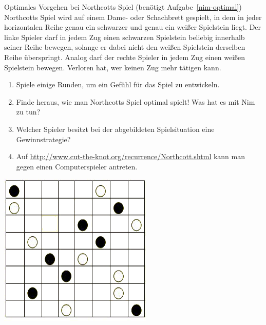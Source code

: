 \documentclass{zirkelblatt}
\begin{document}
\begin{aufgabe}{Optimales Vorgehen bei Northcotts Spiel
(benötigt Aufgabe~\ref{nim-optimal})}
Northcotts Spiel wird auf einem Dame- oder Schachbrett gespielt, in dem in
jeder horizontalen Reihe genau ein schwarzer und genau ein weißer Spielstein liegt.
Der linke Spieler darf in jedem Zug einen schwarzen Spielstein beliebig
innerhalb seiner Reihe bewegen, solange er dabei nicht den weißen Spielstein
derselben Reihe überspringt. Analog darf der rechte Spieler in jedem Zug einen
weißen Spielstein bewegen. Verloren hat, wer keinen Zug mehr tätigen kann.

\begin{enumerate}
\item Spiele einige Runden, um ein Gefühl für das Spiel zu entwickeln.
\item Finde heraus, wie man Northcotts Spiel optimal spielt! Was hat es mit Nim zu tun?
\item Welcher Spieler besitzt bei der abgebildeten Spielsituation eine
Gewinnstrategie?
\item Auf \url{http://www.cut-the-knot.org/recurrence/Northcott.shtml} kann man
gegen einen Computerspieler antreten.
\end{enumerate}

\begin{center}
\includegraphics[scale=0.5]{northcott}
\end{center}
\end{aufgabe}
\end{document}

